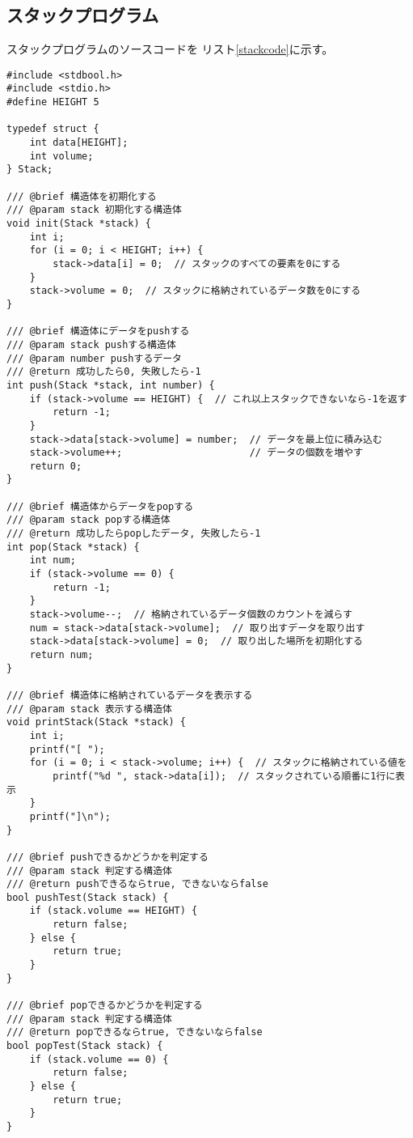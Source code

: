 \documentclass[a4j]{jarticle}
\begin{document}
\subsection{スタックプログラム}
スタックプログラムのソースコードを
リスト\ref{stackcode}に示す。
\begin{lstlisting}[caption=スタックプログラム,label=stackcode]
#include <stdbool.h>
#include <stdio.h>
#define HEIGHT 5

typedef struct {
    int data[HEIGHT];
    int volume;
} Stack;

/// @brief 構造体を初期化する
/// @param stack 初期化する構造体
void init(Stack *stack) {
    int i;
    for (i = 0; i < HEIGHT; i++) {
        stack->data[i] = 0;  // スタックのすべての要素を0にする
    }
    stack->volume = 0;  // スタックに格納されているデータ数を0にする
}

/// @brief 構造体にデータをpushする
/// @param stack pushする構造体
/// @param number pushするデータ
/// @return 成功したら0, 失敗したら-1
int push(Stack *stack, int number) {
    if (stack->volume == HEIGHT) {  // これ以上スタックできないなら-1を返す
        return -1;
    }
    stack->data[stack->volume] = number;  // データを最上位に積み込む
    stack->volume++;                      // データの個数を増やす
    return 0;
}

/// @brief 構造体からデータをpopする
/// @param stack popする構造体
/// @return 成功したらpopしたデータ, 失敗したら-1
int pop(Stack *stack) {
    int num;
    if (stack->volume == 0) {
        return -1;
    }
    stack->volume--;  // 格納されているデータ個数のカウントを減らす
    num = stack->data[stack->volume];  // 取り出すデータを取り出す
    stack->data[stack->volume] = 0;  // 取り出した場所を初期化する
    return num;
}

/// @brief 構造体に格納されているデータを表示する
/// @param stack 表示する構造体
void printStack(Stack *stack) {
    int i;
    printf("[ ");
    for (i = 0; i < stack->volume; i++) {  // スタックに格納されている値を
        printf("%d ", stack->data[i]);  // スタックされている順番に1行に表示
    }
    printf("]\n");
}

/// @brief pushできるかどうかを判定する
/// @param stack 判定する構造体
/// @return pushできるならtrue, できないならfalse
bool pushTest(Stack stack) {
    if (stack.volume == HEIGHT) {
        return false;
    } else {
        return true;
    }
}

/// @brief popできるかどうかを判定する
/// @param stack 判定する構造体
/// @return popできるならtrue, できないならfalse
bool popTest(Stack stack) {
    if (stack.volume == 0) {
        return false;
    } else {
        return true;
    }
}


\end{lstlisting}
\end{document}

